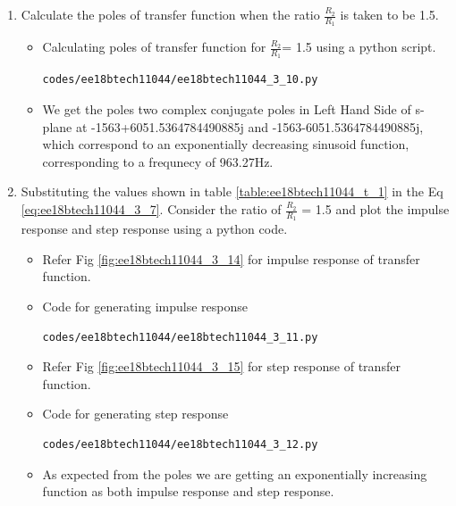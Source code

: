 \begin{enumerate}[label=\arabic*.,ref=\theenumi]
\item Calculate the poles of transfer function when the ratio $\frac{R_2}{R_1}$ is taken to be 1.5.

\solution

\begin{itemize}
\item Calculating poles of transfer function for $\frac{R_2}{R_1}$= 1.5 using a python script.
\begin{lstlisting}
codes/ee18btech11044/ee18btech11044_3_10.py
\end{lstlisting}
\item We get the poles two complex conjugate poles in Left Hand Side of s-plane at  -1563+6051.5364784490885j and -1563-6051.5364784490885j, which correspond to an exponentially decreasing sinusoid function, corresponding to a frequnecy of 963.27Hz. 
\end{itemize}

\item Substituting the values shown in table \ref{table:ee18btech11044_t_1} in the Eq \ref{eq:ee18btech11044_3_7}. Consider the ratio of $\frac{R_2}{R_1}$ = 1.5 and plot the impulse response and step response using a python code.

\solution

\begin{itemize}
\item Refer Fig \ref{fig:ee18btech11044_3_14} for impulse response of transfer function.
\item Code for generating impulse response
\begin{lstlisting}
codes/ee18btech11044/ee18btech11044_3_11.py
\end{lstlisting}
\item Refer Fig \ref{fig:ee18btech11044_3_15} for step response of transfer function.
\item Code for generating step response
\begin{lstlisting}
codes/ee18btech11044/ee18btech11044_3_12.py
\end{lstlisting}
\item As expected from the poles we are getting an exponentially increasing function as both impulse response and step response.
\end{itemize}


\end{enumerate}
